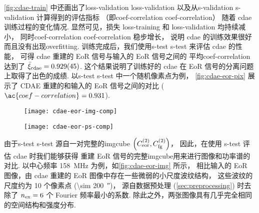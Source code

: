 \autoref{fig:cdae-train} 中还画出了\acl{loss-validation} \ac{loss-validation}
以及从\acl{s-validation} \ac{s-validation} 计算得到的评估指标
（即\acl{coef-correlation} \ac{coef-correlation}）
随着 \ac{cdae} 训练过程的变化情况.
显然可见，损失 \ac{loss-training} 和 \ac{loss-validation} 均持续减小，
同时\acl{coef-correlation} \ac{coef-correlation} 稳步增长，
说明 \ac{cdae} 的训练效果很好而且没有出现\ac{overfitting}.
训练完成后，我们使用\acl{s-test} \ac{s-test} 来评估 \ac{cdae} 的性能，
可得 \ac{cdae} 重建的 EoR 信号与输入的 EoR 信号之间的
平均\acl{coef-correlation}达到了
$\bar{\xi}_{\mathrm{cdae}} = \num{0.929 +- 0.045}$.
这个结果说明了训练好的 \ac{cdae} 在 EoR 信号的分离问题上取得了出色的成绩.
以\acl*{s-test} \ac*{s-test} 中一个随机像素点为例，
\autoref{fig:cdae-eor-pix} 展示了 CDAE 重建的和输入的 EoR 信号之间的对比
($\ac{coef-correlation} = 0.931$).

\begin{figure}[htp]
  \centering
  \texttt{[image: cdae-eor-img-comp]}
  \label{fig:cdae-eor-img}
\end{figure}

\begin{figure}[htp]
  \centering
  \texttt{[image: cdae-eor-ps-comp]}
  \label{fig:cdae-eor-ps}
\end{figure}

由于\acl{s-test} \ac{s-test} 源自一对完整的\ac{imgcube}
$\left( C_{\mathrm{eor}}^{(2)}, C_{\mathrm{fg}}^{(2)} \right)$，
因此，在使用 \ac{s-test} 评估 \ac{cdae} 时我们能够获得
重建 EoR 信号的完整\ac{imgcube}用来进行图像和功率谱的对比.
以中心频率 \SI{158}{\MHz} 为例，如\autoref{fig:cdae-eor-img} 所示，
相比输入的 EoR 图像，由 \ac{cdae} 重建的 EoR 图像中存在一些微弱的小尺度波纹结构，
这些波纹的尺度约为 10 个像素点 (\SI{\sim 200}{\arcsecond})，
源自数据预处理 (\autoref{sec:preprocessing}) 时去除了 $n_{\mathrm{ex}} = 6$
个 Fourier 频率最小的系数.
除此之外，两张图像具有几乎完全相同的空间结构和强度分布.

